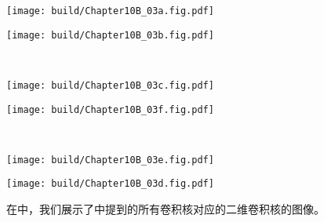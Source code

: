 \begin{Figure}[二维卷积核]
    \begin{FigureSub}[Box]
        \texttt{[image: build/Chapter10B\_03a.fig.pdf]}\hspace*{0.5cm}
    \end{FigureSub}\hspace{0.5cm}
    \begin{FigureSub}[Tent]
        \texttt{[image: build/Chapter10B\_03b.fig.pdf]}\hspace*{0.5cm}
    \end{FigureSub}\\
    \begin{FigureSub}[Gaussian]
        \texttt{[image: build/Chapter10B\_03c.fig.pdf]}\hspace*{0.5cm}
    \end{FigureSub}\hspace{0.5cm}
    \begin{FigureSub}
        \texttt{[image: build/Chapter10B\_03f.fig.pdf]}\hspace*{0.5cm}
    \end{FigureSub}\\
    \begin{FigureSub}
        \texttt{[image: build/Chapter10B\_03e.fig.pdf]}\hspace*{0.5cm}
    \end{FigureSub}\hspace{0.5cm}
    \begin{FigureSub}
        \texttt{[image: build/Chapter10B\_03d.fig.pdf]}\hspace*{0.5cm}
    \end{FigureSub}
\end{Figure}
在中，我们展示了中提到的所有卷积核对应的二维卷积核的图像。


